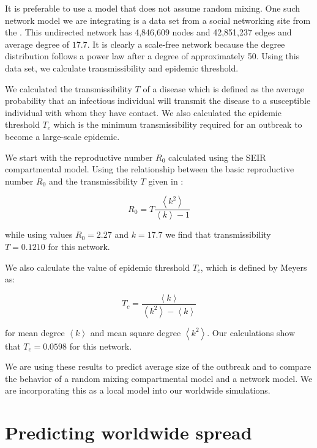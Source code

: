 \documentclass[10pt, journal,onecolumn]{IEEEtran}
\begin{document}
It is preferable to use a model that does not assume random mixing.
One such network model we are integrating is a data set from a social networking site from
the \cite{topcoderdata}.
This undirected network has 4,846,609 nodes and 42,851,237 edges and average degree of $17.7$.
It is clearly a scale-free network because the degree distribution follows a power law after a degree of
approximately 50.
Using this data set, we calculate transmissibility and epidemic threshold.

We calculated the transmissibility $T$ of a disease which is defined as the average probability that an infectious
individual will transmit the disease to a susceptible individual with whom they have contact. We also calculated
the epidemic threshold $T_c$ which is the minimum transmissibility required for an outbreak to become
a large-scale epidemic.

We start with the reproductive number $R_0$ calculated using the SEIR compartmental model.
Using the relationship between the basic reproductive number
$R_0$ and the transmissibility $T$ given in \cite{meyers2005network}:

\[
R_0 = T  \dfrac{\left\langle k^2 \right\rangle}{\left\langle k \right\rangle-1}
\]

while using values $R_0=2.27$ and $k=17.7$ we find that transmissibility $T=0.1210$ for this network.

We also calculate the value of epidemic threshold $T_c$, which is defined by Meyers as:

\[
T_c =\dfrac{\left\langle k \right\rangle}{\left\langle k^2 \right\rangle - \left\langle k \right\rangle}
\]

for mean degree $\left\langle k \right\rangle$ and mean square degree
$\left\langle k^2 \right\rangle$. Our calculations show that $T_c=0.0598$ for this network.

We are using these results to predict average size of the outbreak and to compare the behavior of
a random mixing compartmental model and a network model.
We are incorporating this as a local model into our worldwide simulations.






\section{Predicting worldwide spread}
\label{sec:Worldwide}
\end{document}
